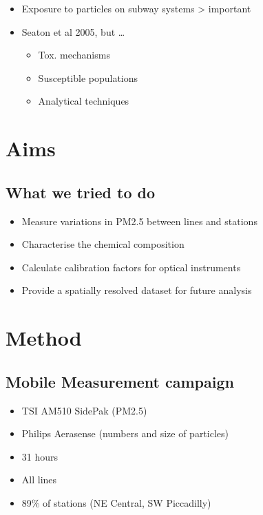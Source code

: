 \documentclass[]{article}
\providecommand{\tightlist}{%
  \setlength{\itemsep}{0pt}\setlength{\parskip}{0pt}}
\begin{document}
\begin{itemize}
\item
  Exposure to particles on subway systems \textgreater{} important
\item
  Seaton et al 2005, but \ldots{}

  \begin{itemize}
  \tightlist
  \item
    Tox. mechanisms
  \item
    Susceptible populations
  \item
    Analytical techniques
  \end{itemize}
\end{itemize}

\hypertarget{aims}{%
\section{Aims}\label{aims}}

\hypertarget{what-we-tried-to-do}{%
\subsection{What we tried to do}\label{what-we-tried-to-do}}

\begin{itemize}
\tightlist
\item
  Measure variations in PM2.5 between lines and stations
\item
  Characterise the chemical composition
\item
  Calculate calibration factors for optical instruments
\item
  Provide a spatially resolved dataset for future analysis
\end{itemize}

\hypertarget{method}{%
\section{Method}\label{method}}

\hypertarget{mobile-measurement-campaign}{%
\subsection{Mobile Measurement
campaign}\label{mobile-measurement-campaign}}

\begin{itemize}
\tightlist
\item
  TSI AM510 SidePak (PM2.5)
\item
  Philips Aerasense (numbers and size of particles)
\item
  31 hours
\item
  All lines
\item
  89\% of stations (NE Central, SW Piccadilly)
\end{itemize}
\end{document}

